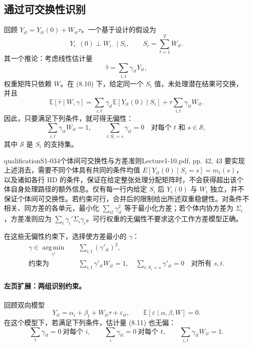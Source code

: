 \subsection{通过可交换性识别}
回顾 $Y_{it}=Y_{it}(0)+W_{it}\tau$。一个基于设计的假设为
\[
 Y_{i\cdot}(0)\perp W_{i\cdot}\mid S_i,
 \qquad S_i=\sum_{t=1}^TW_{it}.\tag{8.10}
\]
其一个推论：考虑线性估计量
\[
 \widehat\tau=\sum_{i,t}\gamma_{it}Y_{it},\tag{8.11}
\]
权重矩阵只依赖 $W$。在 (8.10) 下，给定同一个 $S_i$ 值，未处理潜在结果可交换，并且
\[
 \mathbb E[\widehat\tau\mid W,\gamma]
 =\sum_{i,t}\gamma_{it}\mathbb E[Y_{it}(0)\mid S_i]
 +\tau\sum_{i,t}\gamma_{it}W_{it}.
\]
因此，只要满足下列条件，就可得无偏性：
\[
 \sum_{i,t}\gamma_{it}W_{it}=1,
 \qquad
 \sum_{i:S_i=s}\gamma_{it}=0
 \quad\text{对每个 }t\text{ 和 }s\in\mathcal S,
\]
其中 $\mathcal S$ 是 $S_i$ 的支持集。
\begin{reviewnote}{qualification}{S1-034}{个体间可交换性与方差准则}{Lecture1-10.pdf, pp. 42, 43}
要实现上述消去，需要不同个体具有共同的条件均值 $E[Y_{it}(0)\mid S_i=s]=m_t(s)$，以及诸如各行 IID 的条件，保证在给定整张处理分配矩阵时，不会获得超出该个体自身处理路径的额外信息。仅有每一行内给定 $S_i$ 后 $Y_i(0)$ 与 $W_i$ 独立，并不保证个体间可交换性。若约束可行，合并后的限制给出所述双重稳健性。对条件不相关、同方差的各单元，最小化 $\sum_{it}\gamma_{it}^2$ 等于最小化方差；若个体内协方差为 $\Sigma_i$，方差准则应为 $\sum_i\gamma_i'\Sigma_i\gamma_i$。可行权重的无偏性不要求这个工作方差模型正确。
\end{reviewnote}


在这些无偏性约束下，选择使方差最小的 $\gamma$：
\begin{align*}
 \gamma\in\operatorname*{arg\,min}_{\gamma'}\quad&\sum_{i,t}(\gamma'_{it})^2,\\
 \text{约束为}\quad&\sum_{i,t}\gamma'_{it}W_{it}=1,
 \quad\sum_{i:S_i=s}\gamma'_{it}=0\quad\text{对所有 }s,t.\tag{8.14}
\end{align*}

\paragraph{左页扩展：两组识别约束。}
回顾双向模型
\[
 Y_{it}=\alpha_i+\beta_t+W_{it}\tau+\varepsilon_{it},
 \qquad\mathbb E[\varepsilon\mid\alpha,\beta,W]=0.\tag{8.2，回顾}
\]
在这个模型下，若满足下列条件，估计量 (8.11) 也无偏：
\[
 \sum_t\gamma_{it}=0\ \text{对每个 }i,
 \qquad\sum_i\gamma_{it}=0\ \text{对每个 }t,
 \qquad\sum_{i,t}\gamma_{it}W_{it}=1.
\]

